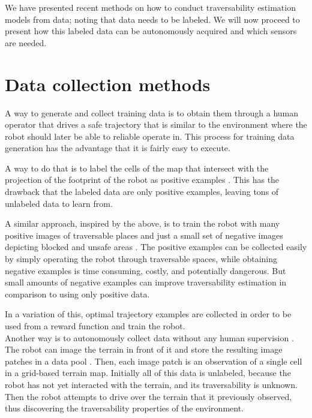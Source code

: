 \documentclass[12pt,a4paper]{report}
\begin{document}
	
	We have presented recent methods on how to conduct traversability estimation 
	models from data; noting that data needs to be labeled. We will now proceed to 
	present how this labeled data can be autonomously acquired and which sensors are 
	needed.
	\\
	
	\section{Data collection methods}
	\label{sec:bg:data}
	
	A way to generate and collect training data is to obtain them through a human 
	operator that drives a safe trajectory that is similar to the environment where 
	the robot should later be able to reliable operate in. This process for training 
	data generation has the advantage that it is fairly easy to execute.
	\par 
	A way to do that is to label the cells of the map that intersect with the 
	projection of the footprint of the robot as positive examples \cite{Suger}. 
	This has the drawback that the labeled data are only positive examples, leaving 
	tons of unlabeled data to learn from.
	\par
	A similar approach, inspired by the above, is to train the robot with many 
	positive images of traversable places and just a small set of negative images 
	depicting blocked and unsafe areas \cite{HiroseGonet}. The positive examples can 
	be collected easily by simply operating the robot through traversable spaces, 
	while obtaining negative examples is time consuming, costly, and potentially 
	dangerous. But small amounts of negative examples can improve traversability 
	estimation in comparison to using only positive data.
	\par 
	In a variation of this, optimal trajectory examples are collected \cite{Wigness} 
	in order to be used from a reward function and train the robot.
	\\
	
	Another way is to autonomously collect data without any human supervision 
	\cite{Kim, Lee}. The robot can image the terrain in front of it and store the 
	resulting image patches in a data pool \cite{Kim}. Then, each image patch is an 
	observation of a single cell in a grid-based terrain map. Initially all of this 
	data is unlabeled, because the robot has not yet interacted with the terrain, and 
	its traversability is unknown. Then the robot attempts to drive over the 
	terrain that it previously observed, thus discovering the traversability 
	properties of the environment.
	\\\\
	
\end{document}
